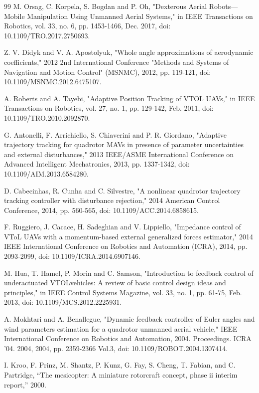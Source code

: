 \begin{thebibliography}{99}
 M. Orsag, C. Korpela, S. Bogdan and P. Oh, "Dexterous Aerial Robots—Mobile Manipulation Using Unmanned Aerial Systems," in IEEE Transactions on Robotics, vol. 33, no. 6, pp. 1453-1466, Dec. 2017, doi: 10.1109/TRO.2017.2750693.

 Z. V. Didyk and V. A. Apostolyuk, "Whole angle approximations of aerodynamic coefficients," 2012 2nd International Conference "Methods and Systems of Navigation and Motion Control" (MSNMC), 2012, pp. 119-121, doi: 10.1109/MSNMC.2012.6475107.

 A. Roberts and A. Tayebi, "Adaptive Position Tracking of VTOL UAVs," in IEEE Transactions on Robotics, vol. 27, no. 1, pp. 129-142, Feb. 2011, doi: 10.1109/TRO.2010.2092870.

 G. Antonelli, F. Arrichiello, S. Chiaverini and P. R. Giordano, "Adaptive trajectory tracking for quadrotor MAVs in presence of parameter uncertainties and external disturbances," 2013 IEEE/ASME International Conference on Advanced Intelligent Mechatronics, 2013, pp. 1337-1342, doi: 10.1109/AIM.2013.6584280.

 D. Cabecinhas, R. Cunha and C. Silvestre, "A nonlinear quadrotor trajectory tracking controller with disturbance rejection," 2014 American Control Conference, 2014, pp. 560-565, doi: 10.1109/ACC.2014.6858615.

 F. Ruggiero, J. Cacace, H. Sadeghian and V. Lippiello, "Impedance control of VToL UAVs with a momentum-based external generalized forces estimator," 2014 IEEE International Conference on Robotics and Automation (ICRA), 2014, pp. 2093-2099, doi: 10.1109/ICRA.2014.6907146.

 M. Hua, T. Hamel, P. Morin and C. Samson, "Introduction to feedback control of underactuated VTOLvehicles: A review of basic control design ideas and principles," in IEEE Control Systems Magazine, vol. 33, no. 1, pp. 61-75, Feb. 2013, doi: 10.1109/MCS.2012.2225931.

 A. Mokhtari and A. Benallegue, "Dynamic feedback controller of Euler angles and wind parameters estimation for a quadrotor unmanned aerial vehicle," IEEE International Conference on Robotics and Automation, 2004. Proceedings. ICRA '04. 2004, 2004, pp. 2359-2366 Vol.3, doi: 10.1109/ROBOT.2004.1307414.

 I. Kroo, F. Prinz, M. Shantz, P. Kunz, G. Fay, S. Cheng, T. Fabian, and C. Partridge, “The mesicopter: A miniature rotorcraft concept, phase ii interim report,” 2000.


\end{thebibliography}
